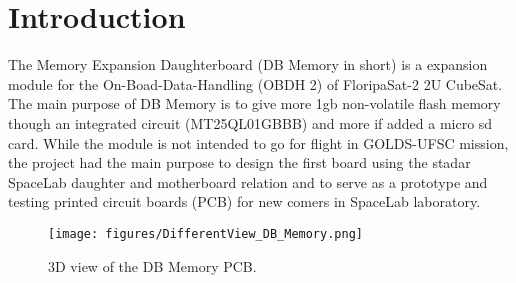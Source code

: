 %
%
%
%
%

%
%
%
%
%
%
%

\chapter{Introduction} \label{ch:introduction}

The Memory Expansion Daughterboard (DB Memory in short) is a expansion module for the On-Boad-Data-Handling (OBDH 2) 
of FloripaSat-2 2U CubeSat. The main purpose of DB Memory is to give more 1gb non-volatile flash memory 
though an integrated circuit (MT25QL01GBBB) and more if added a micro sd card. 
While the module is not intended to go for flight in GOLDS-UFSC mission, 
the project had the main purpose to design the first board using the stadar SpaceLab daughter and motherboard relation 
and to serve as a prototype and testing printed circuit boards (PCB) for new comers in SpaceLab laboratory.

\begin{figure}[!ht]
    \begin{center}
        \texttt{[image: figures/DifferentView\_DB\_Memory.png]}
        \caption{3D view of the DB Memory PCB.}
        \label{fig:pcb-3d-DifferentView}
    \end{center}
\end{figure}